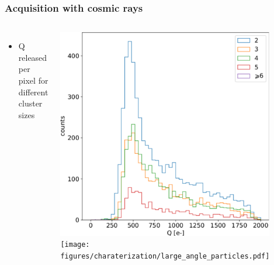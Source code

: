     \begin{frame}
        \frametitle{Acquisition with cosmic rays}
        \begin{columns}
                \begin{itemize}
                    \item Q released per pixel for different cluster sizes 
                \end{itemize}
                \bigskip
                \includegraphics[width=1.1\linewidth]{figures/charaterization/cosmic_rays_spectrum_per_pixel.pdf} 
            \centering\texttt{[image: figures/charaterization/large\_angle\_particles.pdf]}
                \begin{figure}
                    \includegraphics[width=.3\linewidth]{figures/charaterization/evts/cosmic_rays/11a.png}

\end{figure}
\end{columns}
\end{frame}
